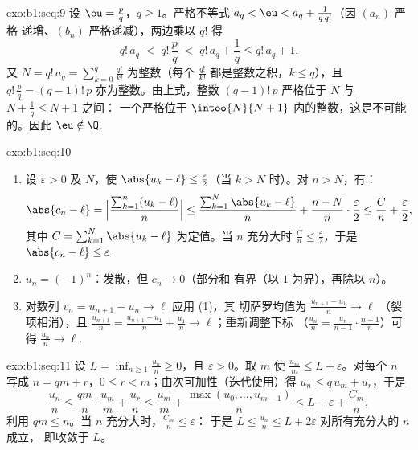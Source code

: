 \begin{solution}{exo:b1:seq:9}
设 $\eu = \frac pq$，$q \geq 1$。严格不等式 $a_q <
\eu < a_q + \frac{1}{q\,q!}$（因 $(a_n)$ 严格
递增、$(b_n)$ 严格递减），两边乘以 $q!$ 得
\[
q!\,a_q \;<\; q!\,\frac pq \;<\; q!\,a_q + \frac 1q \leq q!\,a_q + 1.
\]
又 $N = q!\,a_q = \sum_{k=0}^{q} \frac{q!}{k!}$ 为整数（每个
$\frac{q!}{k!}$ 都是整数之积，$k \leq q$），且
$q!\,\frac pq = (q-1)!\,p$ 亦为整数。由上式，整数
$(q-1)!\,p$ 严格位于 $N$ 与 $N + \frac 1q \leq N + 1$ 之间：
一个严格位于 $\intoo{N}{N+1}$ 内的整数，这是不可能的。因此
$\eu \notin \Q$.
\end{solution}

\begin{solution}{exo:b1:seq:10}
\begin{enumerate}
  \item 设 $\varepsilon > 0$ 及 $N$，使 $\abs{u_k - \ell} \leq
        \frac{\varepsilon}{2}$（当 $k > N$ 时）。对 $n > N$，有：
        \[
        \abs{c_n - \ell}
        = \Bigl|\frac{\sum_{k=1}^{n}(u_k - \ell)}{n}\Bigr|
        \leq \frac{\sum_{k=1}^{N} \abs{u_k - \ell}}{n}
        + \frac{n - N}{n}\cdot\frac{\varepsilon}{2}
        \leq \frac{C}{n} + \frac{\varepsilon}{2},
        \]
        其中 $C = \sum_{k=1}^N \abs{u_k - \ell}$ 为定值。当 $n$
        充分大时 $\frac Cn \leq \frac\varepsilon2$，于是 $\abs{c_n -
        \ell} \leq \varepsilon$.
  \item $u_n = (-1)^n$：发散，但 $c_n \to 0$（部分和
        有界（以 $1$ 为界），再除以 $n$）。
  \item 对数列 $v_n = u_{n+1} - u_n \to \ell$ 应用 (1)，其
        切萨罗均值为 $\frac{u_{n+1} - u_1}{n} \to \ell$
        （裂项相消），且 $\frac{u_{n+1}}{n} = \frac{u_{n+1} -
        u_1}{n} + \frac{u_1}{n} \to \ell$；重新调整下标
        （$\frac{u_n}{n} = \frac{u_n}{n-1}\cdot\frac{n-1}{n}$）可得
        $\frac{u_n}{n} \to \ell$.
\end{enumerate}
\end{solution}

\begin{solution}{exo:b1:seq:11}
设 $L = \inf_{n \geq 1} \frac{u_n}{n} \geq 0$，且 $\varepsilon >
0$。取 $m$ 使 $\frac{u_m}{m} \leq L + \varepsilon$。对每个 $n$
写成 $n = qm + r$，$0 \leq r < m$；由次可加性（迭代使用）得
$u_n \leq q\,u_m + u_r$，于是
\[
\frac{u_n}{n} \leq \frac{q m}{n}\cdot\frac{u_m}{m} + \frac{u_r}{n}
\leq \frac{u_m}{m} + \frac{\max(u_0, \dots, u_{m-1})}{n}
\leq L + \varepsilon + \frac{C_m}{n},
\]
利用 $qm \leq n$。当 $n$ 充分大时，$\frac{C_m}{n} \leq \varepsilon$：
于是 $L \leq \frac{u_n}{n} \leq L + 2\varepsilon$ 对所有充分大的 $n$ 成立，
即收敛于 $L$。
\end{solution}

